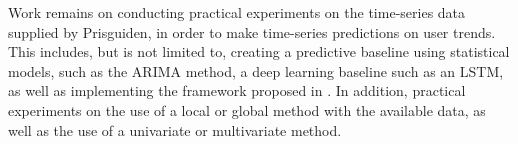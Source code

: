   Work remains on conducting practical experiments on the time-series data supplied by Prisguiden,
  in order to make time-series predictions on user trends.
  This includes, but is not limited to, creating a predictive baseline using statistical models, such as the ARIMA method, a deep learning baseline such as an LSTM,
  as well as implementing the framework proposed in .
  In addition, practical experiments on the use of a local or global method with the available data,
  as well as the use of a univariate or multivariate method.
\fi

